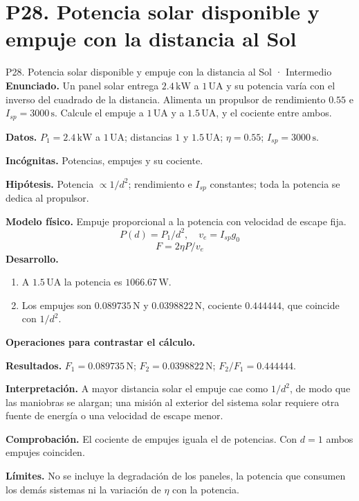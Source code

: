 \section{P28. Potencia solar disponible y empuje con la distancia al Sol}
\begin{studiumworked}{P28. Potencia solar disponible y empuje con la distancia al Sol · Intermedio}
\textbf{Enunciado.} Un panel solar entrega $2.4\,\mathrm{kW}$ a $1\,\mathrm{UA}$ y su potencia varía con el inverso del cuadrado de la distancia. Alimenta un propulsor de rendimiento $0.55$ e $I_{sp}=3000\,\mathrm s$. Calcule el empuje a $1\,\mathrm{UA}$ y a $1.5\,\mathrm{UA}$, y el cociente entre ambos.

\textbf{Datos.} $P_1=2.4\,\mathrm{kW}$ a $1\,\mathrm{UA}$; distancias $1$ y $1.5\,\mathrm{UA}$; $\eta=0.55$; $I_{sp}=3000\,\mathrm s$.

\textbf{Incógnitas.} Potencias, empujes y su cociente.

\textbf{Hipótesis.} Potencia $\propto1/d^2$; rendimiento e $I_{sp}$ constantes; toda la potencia se dedica al propulsor.

\textbf{Modelo físico.} Empuje proporcional a la potencia con velocidad de escape fija.
\[P(d)=P_1/d^2,\quad v_e=I_{sp}g_0\]
\[F=2\eta P/v_e\]
\textbf{Desarrollo.}
\begin{enumerate}
\item A $1.5\,\mathrm{UA}$ la potencia es $1066.67\,\mathrm W$.
\item Los empujes son $0.089735\,\mathrm N$ y $0.0398822\,\mathrm N$, cociente $0.444444$, que coincide con $1/d^2$.
\end{enumerate}
\textbf{Operaciones para contrastar el cálculo.}

\textbf{Resultados.} $F_1=0.089735\,\mathrm N$; $F_2=0.0398822\,\mathrm N$; $F_2/F_1=0.444444$.

\textbf{Interpretación.} A mayor distancia solar el empuje cae como $1/d^2$, de modo que las maniobras se alargan; una misión al exterior del sistema solar requiere otra fuente de energía o una velocidad de escape menor.

\textbf{Comprobación.} El cociente de empujes iguala el de potencias. Con $d=1$ ambos empujes coinciden.

\textbf{Límites.} No se incluye la degradación de los paneles, la potencia que consumen los demás sistemas ni la variación de $\eta$ con la potencia.
\end{studiumworked}
